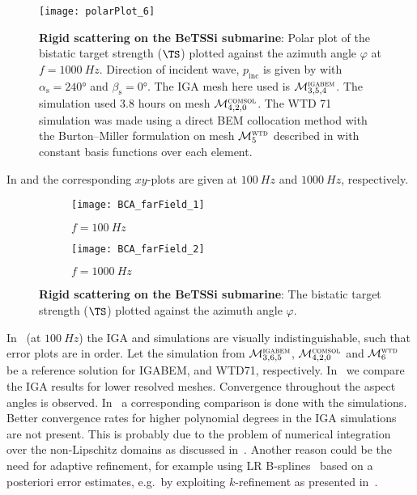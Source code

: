 \begin{figure}
	\centering
	\texttt{[image: polarPlot\_6]}
	\caption{\textbf{Rigid scattering on the BeTSSi submarine}: Polar plot of the bistatic target strength ($\TS$) plotted against the azimuth angle $\varphi$ at $f=\SI{1000}{Hz}$. Direction of incident wave, $p_{\mathrm{inc}}$ is given by  with $\alpha_{\mathrm{s}}=\ang{240}$ and $\beta_{\mathrm{s}}=\ang{0}$. The IGA mesh here used is ${\cal M}_{3,5,4}^{\textsc{igabem}}$. The \COMSOL simulation used \num{3.8} hours on mesh ${\cal M}_{4,2,0}^{\textsc{comsol}}$. The WTD 71 simulation was made using a direct BEM collocation method with the Burton--Miller formulation on mesh ${\cal M}_{5}^{\textsc{wtd}}$ described in  with constant basis functions over each element.}
	\label{Eq3:polar_BI}
\end{figure}
In  and  the corresponding $xy$-plots are given at $\SI{100}{Hz}$ and $\SI{1000}{Hz}$, respectively.
\begin{figure}
	\centering
	\begin{subfigure}[t]{\textwidth}
		\texttt{[image: BCA\_farField\_1]}
		\caption{$f=\SI{100}{Hz}$}
		\label{Fig3:xy_BI_100}
	\end{subfigure} 
	\par\bigskip
	\par\bigskip
	\begin{subfigure}[t]{\textwidth}
		\texttt{[image: BCA\_farField\_2]}
		\caption{$f=\SI{1000}{Hz}$}
		\label{Fig3:xy_BI_1000}
	\end{subfigure} 
	\caption{\textbf{Rigid scattering on the BeTSSi submarine}: The bistatic target strength ($\TS$) plotted against the azimuth angle $\varphi$.}
\end{figure}
In~ (at $\SI{100}{Hz}$) the IGA and \COMSOL simulations are visually indistinguishable, such that error plots are in order. Let the simulation from ${\cal M}_{3,6,5}^{\textsc{igabem}}$, ${\cal M}_{4,2,0}^{\textsc{comsol}}$ and ${\cal M}_{6}^{\textsc{wtd}}$ be a reference solution for IGABEM, \COMSOL and WTD71, respectively. In~ we compare the IGA results for lower resolved meshes. Convergence throughout the aspect angles is observed. In~ a corresponding comparison is done with the \COMSOL simulations. Better convergence rates for higher polynomial degrees in the IGA simulations are not present. This is probably due to the problem of numerical integration over the non-Lipschitz domains as discussed in~. Another reason could be the need for adaptive refinement, for example using LR B-splines~\cite{Johannessen2014iau} based on a posteriori error estimates, e.g.\ by exploiting $k$-refinement as presented in~\cite{Kumar2015sap}.
